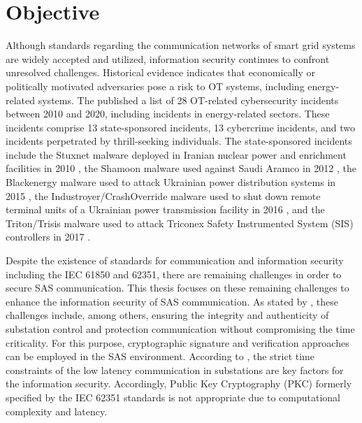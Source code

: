\section{Objective}
\label{sec:introduction:objective}
Although standards regarding the communication networks of smart grid systems are widely accepted and utilized, information security continues to confront unresolved challenges.
Historical evidence indicates that economically or politically motivated adversaries pose a risk to OT systems, including energy-related systems.
The \citeauthor{canada2021} \cite{canada2021} published a list of 28 OT-related cybersecurity incidents between 2010 and 2020, including incidents in energy-related sectors.
These incidents comprise 13 state-sponsored incidents, 13 cybercrime incidents, and two incidents perpetrated by thrill-seeking individuals.
The state-sponsored incidents include the Stuxnet malware deployed in Iranian nuclear power and enrichment facilities in 2010 \cite{bbc2010}, the Shamoon malware used against Saudi Aramco in 2012 \cite{reuters2012}, the Blackenergy malware used to attack Ukrainian power distribution systems in 2015 \cite{cisa2021a}, the Industroyer/CrashOverride malware used to shut down remote terminal units of a Ukrainian power transmission facility in 2016 \cite{reuters2016,cisa2021b}, and the Triton/Trisis malware used to attack Triconex Safety Instrumented System (SIS) controllers in 2017 \cite{johnson2017}.

Despite the existence of standards for communication and information security including the IEC 61850 and 62351, there are remaining challenges in order to secure SAS communication.
This thesis focuses on these remaining challenges to enhance the information security of SAS communication.
As stated by \citeauthor{Ishchenko2018} \cite{Ishchenko2018}, these challenges include, among others, ensuring the integrity and authenticity of substation control and protection communication without compromising the time criticality.
For this purpose, cryptographic signature and verification approaches can be employed in the SAS environment.
According to \citeauthor{Elbez2019} \cite{Elbez2019}, the strict time constraints of the low latency communication in substations are key factors for the information security.
Accordingly, Public Key Cryptography (PKC) formerly specified by the IEC 62351 standards is not appropriate due to computational complexity and latency.

